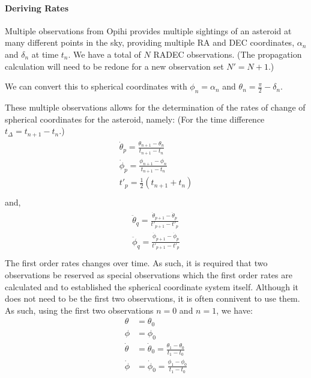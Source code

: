 \documentclass[letterpaper,11pt,english]{sphinxmanual}
\begin{document}
\paragraph{Deriving Rates}
\label{\detokenize{technical/algorithms/spherical_kinematics:deriving-rates}}
\sphinxAtStartPar
Multiple observations from Opihi provides multiple sightings of an asteroid at
many different points in the sky, providing multiple RA and DEC coordinates,
\(\alpha_n\) and \(\delta_n\) at time \(t_n\). We have a total of
\(N\) RA\sphinxhyphen{}DEC observations. (The propagation calculation will need to be
redone for a new observation set \(N' = N + 1\).)

\sphinxAtStartPar
We can convert this to spherical coordinates with \(\phi_n = \alpha_n\)
and \(\theta_n = \frac{\pi}{2} - \delta_n\).

\sphinxAtStartPar
These multiple observations allows for the determination of the rates of
change of spherical coordinates for the asteroid, namely: (For the time
difference \(t_\Delta = t_{n+1} - t_n\).)
\begin{align*}\!\begin{aligned}
\dot\theta_p = \frac{\theta_{n+1} - \theta_{n}}{t_{n+1} - t_n}\\
\dot\phi_p = \frac{\phi_{n+1} - \phi_{n}}{t_{n+1} - t_n}\\
t'_p = \frac{1}{2} \left( t_{n+1} + t_n \right)\\
\end{aligned}\end{align*}
\sphinxAtStartPar
and,
\begin{align*}\!\begin{aligned}
\ddot\theta_q = \frac{\dot\theta_{p+1} - \dot\theta_{p}}{t'_{p+1} - t'_p}\\
\ddot\phi_q = \frac{\dot\phi_{p+1} - \dot\phi_{p}}{t'_{p+1} - t'_p}\\
\end{aligned}\end{align*}
\sphinxAtStartPar
The first order rates changes over time. As such, it is required that two
observations be reserved as special observations which the first order rates
are calculated and to established the spherical coordinate system itself.
Although it does not need to be the first two observations, it is often
connivent to use them. As such, using the first two observations
\(n=0\) and \(n=1\), we have:
\begin{equation*}
\begin{split}\theta &= \theta_0 \\
\phi &= \phi_0 \\
\dot\theta &= \dot\theta_0 = \frac{\theta_1 - \theta_0}{t_1 - t_0} \\
\dot\phi &= \dot\phi_0 = \frac{\phi_1 - \phi_0}{t_1 - t_0} \\\end{split}
\end{equation*}
\end{document}
